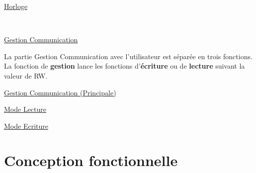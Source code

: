 \documentclass[11pt,french]{article} %
\begin{document}
\vspace{0.2in}
\underline{Horloge}

\begin{minipage}[t, h]{8cm}

\end{minipage}
~
\begin{minipage}[t, h]{8cm}

\end{minipage}


\underline{Gestion Communication}
\vspace{0.2in}

La partie Gestion Communication avec l'utilisateur est séparée en trois fonctions. La fonction de \textbf{gestion} lance les fonctions d'\textbf{écriture} ou de \textbf{lecture} suivant la valeur de RW.

%
%

\vspace{0.2in}
\hspace{0.2in}
\underline{Gestion Communication (Principale)}

\begin{center}

\end{center}

\pagebreak
\begin{landscape}

\hspace{0.2in}
\underline{Mode Lecture}

\hspace{-0.7in}


\vspace{0.5in}

\hspace{0.2in}
\underline{Mode Ecriture}

\hspace{-0.7in}


\end{landscape}

\part{Conception fonctionnelle}

\setcounter{section}{0}
\end{document}
